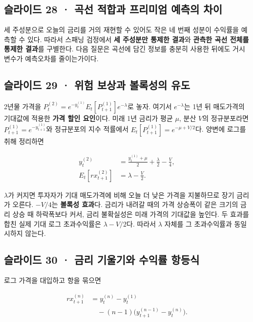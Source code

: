 \documentclass[11pt,a4paper]{article}
\begin{document}
\subsection{슬라이드 28 · 곡선 적합과 프리미엄 예측의 차이}
세 주성분으로 오늘의 금리를 거의 재현할 수 있어도 작은 네 번째 성분이 수익률을 예측할 수 있다. 따라서 스패닝 검정에서 \textbf{세 주성분만 통제한 결과}와 \textbf{관측한 곡선 전체를 통제한 결과}를 구별한다. 다음 질문은 곡선에 담긴 정보를 충분히 사용한 뒤에도 거시 변수가 예측오차를 줄이는가이다.\par

\subsection{슬라이드 29 · 위험 보상과 볼록성의 유도}
2년물 가격을 $P_t^{(2)}=e^{-y_t^{(1)}}E_t[P_{t+1}^{(1)}]e^{-\lambda}$로 놓자. 여기서 $e^{-\lambda}$는 1년 뒤 매도가격의 기대값에 적용한 \textbf{가격 할인 요인}이다. 미래 1년 금리가 평균 $\mu$, 분산 $V$의 정규분포라면 $P_{t+1}^{(1)}=e^{-y_{t+1}^{(1)}}$와 정규분포의 지수 적률에서 $E_t[P_{t+1}^{(1)}]=e^{-\mu+V/2}$다. 양변에 로그를 취해 정리하면\par

\[
\begin{aligned}
y_t^{(2)}&=\frac{y_t^{(1)}+\mu}{2}+\frac{\lambda}{2}-\frac{V}{4},\\
E_t[rx_{t+1}^{(2)}]&=\lambda-\frac{V}{2}.
\end{aligned}
\]

$\lambda$가 커지면 투자자가 기대 매도가격에 비해 오늘 더 낮은 가격을 지불하므로 장기 금리가 오른다. $-V/4$는 \textbf{볼록성 효과}다. 금리가 내려갈 때의 가격 상승폭이 같은 크기의 금리 상승 때 하락폭보다 커서, 금리 불확실성은 미래 가격의 기대값을 높인다. 두 효과를 합친 실제 기대 로그 초과수익률은 $\lambda-V/2$다. 따라서 $\lambda$ 자체를 그 초과수익률과 동일시하지 않는다.\par

\subsection{슬라이드 30 · 금리 기울기와 수익률 항등식}
로그 가격을 대입하고 항을 묶으면\par

\[
\begin{aligned}
rx_{t+1}^{(n)}
&=y_t^{(n)}-y_t^{(1)}\\
&\quad-(n-1)\bigl(y_{t+1}^{(n-1)}-y_t^{(n)}\bigr).
\end{aligned}
\]
\end{document}
